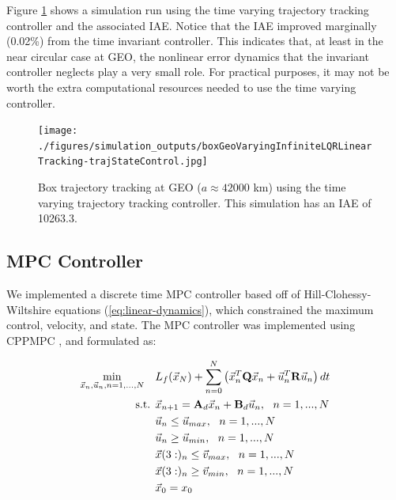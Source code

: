 \documentclass[conference]{IEEEtran}
\begin{document}
Figure \ref{fig:boxGEOvarying} shows a simulation run using the time varying
trajectory tracking controller and the associated IAE. Notice that the IAE
improved marginally (0.02\%) from the time invariant controller. This indicates
that, at least in the near circular case at GEO, the nonlinear error dynamics
that the invariant controller neglects play a very small role. For practical
purposes, it may not be worth the  extra computational resources needed to use
the time varying controller.

\begin{figure}[t]
    \centerline{\texttt{[image: ./figures/simulation\_outputs/boxGeoVaryingInfiniteLQRLinearTracking-trajStateControl.jpg]}}
    \caption{Box trajectory tracking at GEO ($a \approx 42000$ km) using the
        time varying trajectory tracking controller. This
    simulation has an IAE of 10263.3.}
    \label{fig:boxGEOvarying}
\end{figure}


\subsection{MPC Controller}

We implemented a discrete time MPC controller based off of
Hill-Clohessy-Wiltshire equations (\ref{eq:linear-dynamics}), which constrained
the maximum control, velocity, and state. The MPC controller was implemented
using CPPMPC \cite{cppmpc_repo}, and formulated as:

\begin{equation}
    \label{eq:mpc}
    \begin{split}
        \min_{\vec{x}_n, \vec{u}_n, n=1,...,N} \ \ \  & L_f(\vec{x}_N) + \sum_{n=0}^{N} \left( \vec{x}_n^T {\bf Q}
            \vec{x}_n + \vec{u}_n^T {\bf R} \vec{u}_n \right)dt \\
            \text{s.t.   } & \vec{x}_{n+1} = {\bf A}_d\vec{x}_n + {\bf
            B}_d\vec{u}_n,\ \ n=1,...,N \\
                           & \vec{u}_n \leq \vec{u}_{max},\ \ n=1,...,N \\
                           & \vec{u}_n \geq \vec{u}_{min},\ \ n=1,...,N \\
                           & \vec{x}(3:)_n \leq \vec{v}_{max},\ \ n=1,...,N \\
                           & \vec{x}(3:)_n \geq \vec{v}_{min},\ \ n=1,...,N \\
                        & \vec{x}_0 = x_0
    \end{split}
\end{equation}
\end{document}
